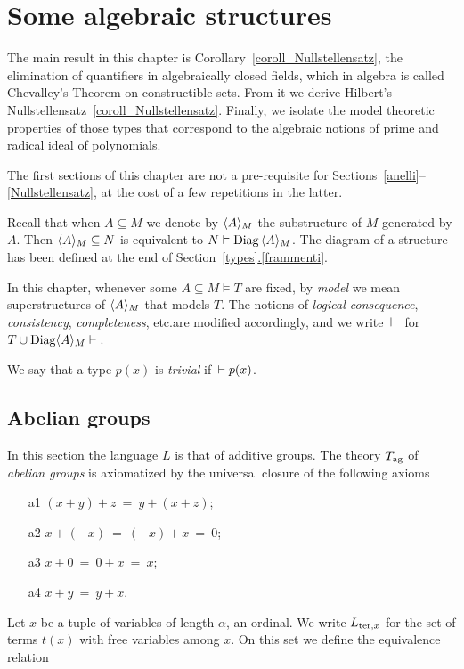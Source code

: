 \documentclass[creche.tex]{subfiles}
\begin{document}
\chapter{Some algebraic structures}
\label{algebraic}

\def\medrel#1{\parbox[b]{6ex}{\hfil$#1$}}
\def\ceq#1#2#3{\parbox[b]{25ex}{$\displaystyle #1$}\medrel{#2}$\displaystyle #3$}

The main result in this chapter is Corollary~\ref{coroll_Nullstellensatz}, the elimination of quantifiers in algebraically closed fields, which in algebra is called Chevalley's Theorem on constructible sets. From it we derive Hilbert's Nullstellensatz~\ref{coroll_Nullstellensatz}. Finally, we isolate the model theoretic properties of those types that correspond to the algebraic notions of prime and radical ideal of polynomials.

The first sections of this chapter are not a pre-requisite for Sections~\ref{anelli}\kern1.5pt--\kern1pt\ref{Nullstellensatz}, at the cost of a few repetitions in the latter.

\begin{notation}\label{notation1}
Recall that when $A\subseteq M$ we denote by \emph{$\langle A\rangle_M$\/} the substructure of $M$ generated by $A$. Then $\langle A\rangle_M\subseteq N$ is equivalent to $N\vDash {\rm Diag}\,\langle A\rangle_M$. The diagram of a structure has been defined at the end of Section~\hyperref[frammenti]{\ref{types}.\ref{frammenti}}.

In this chapter, whenever some $A\subseteq M\models T$ are fixed, by \textit{model\/} we mean superstructures of $\langle A\rangle_M$ that models $T$. The notions of \textit{logical consequence}, \textit{consistency}, \textit{completeness}, etc.\@ are modified accordingly, and we write $\,\vdash\,$ for $T\cup{\rm Diag}\langle A\rangle_M\vdash\,$. 

We say that a type $p(x)$ is \emph{trivial\/} if $\,\vdash p(x)$.\QED
\end{notation}

\section{Abelian groups}
\label{gruppi}
In this section the language $L$ is that of additive groups. The theory \emph{$T_{\rm ag}$} of \emph{abelian groups\/} is axiomatized by the universal closure of the following axioms
\begin{itemize}
\item[a1] $(x+y) +z\ =\ y+(x+z)$;
\item[a2] $x+(-x)\ =\ (-x)+x\ =\ 0$;
\item[a3] $x+0\ = \ 0+x\ = \ x$;
\item[a4] $x+y\ =\ y+x$.
\end{itemize}
Let $x$ be a tuple of variables of length $\alpha$, an ordinal. We write $L_{{\rm ter},x}$ for the set of terms $t(x)$ with free variables among $x$. On this set we define the equivalence relation
\end{document}
